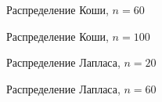 \begin{figure}[H]
		\caption{Распределение Коши, $n=60$}
		\label{fig:kde_cauchy60}
	\end{figure}

\begin{figure}[H]
		\caption{Распределение Коши, $n=100$}
		\label{fig:kde_cauchy100}
	\end{figure}

\begin{figure}[H]
		\caption{Распределение Лапласа, $n=20$}
		\label{fig:kde_laplace20}
	\end{figure}

\begin{figure}[H]
		\caption{Распределение Лапласа, $n=60$}
		\label{fig:kde_laplace60}
	\end{figure}

